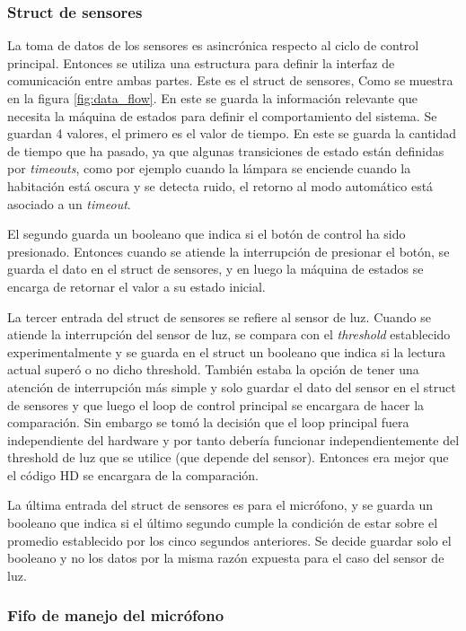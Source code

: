 \subsubsection{Struct de sensores}
La toma de datos de los sensores es asincrónica respecto al ciclo de control principal. Entonces se
utiliza una estructura para definir la interfaz de comunicación entre ambas partes. Este es el
struct de sensores, Como se muestra en la figura \ref{fig:data_flow}. En este se guarda la
información relevante que necesita la máquina de estados para definir el comportamiento del
sistema. Se guardan 4 valores, el primero es el valor de tiempo. En este se guarda la cantidad de
tiempo que ha pasado, ya que algunas transiciones de estado están definidas por \textit{timeouts},
como por ejemplo cuando la lámpara se enciende cuando la habitación está oscura y se detecta ruido,
el retorno al modo automático está asociado a un \textit{timeout}.

El segundo guarda un booleano que indica si el botón de control ha sido presionado. Entonces cuando
se atiende la interrupción de presionar el botón, se guarda el dato en el struct de sensores, y
en luego la máquina de estados se encarga de retornar el valor a su estado inicial.

La tercer entrada del struct de sensores se refiere al sensor de luz. Cuando se atiende la
interrupción del sensor de luz, se compara con el \textit{threshold} establecido experimentalmente y
se guarda en el struct un booleano que indica si la lectura actual superó o no dicho
threshold. También estaba la opción de tener una atención de interrupción más simple y solo guardar
el dato del sensor en el struct de sensores y que luego el loop de control principal se encargara de
hacer la comparación. Sin embargo se tomó la decisión que el loop principal fuera independiente del
hardware y por tanto debería funcionar independientemente del threshold de luz que se utilice (que
depende del sensor). Entonces era mejor que el código HD se encargara de la comparación.

La última entrada del struct de sensores es para el micrófono, y se guarda un booleano que indica si
el último segundo cumple la condición de estar sobre el promedio establecido por los cinco segundos
anteriores. Se decide guardar solo el booleano y no los datos por la misma razón expuesta para el
caso del sensor de luz.

\subsubsection{Fifo de manejo del micrófono}

